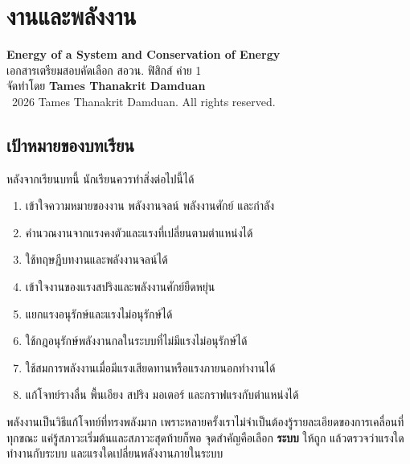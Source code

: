 
\chapter{งานและพลังงาน}

\begin{center}
    {\Large \textbf{Energy of a System and Conservation of Energy}}\\[4pt]
    {\normalsize เอกสารเตรียมสอบคัดเลือก สอวน. ฟิสิกส์ ค่าย 1}\\[6pt]
    {\normalsize จัดทำโดย \textbf{Tames Thanakrit Damduan}}\\[2pt]
    {\footnotesize \textcopyright\ 2026 Tames Thanakrit Damduan. All rights reserved.}\\[8pt]
\end{center}

\section*{เป้าหมายของบทเรียน}

หลังจากเรียนบทนี้ นักเรียนควรทำสิ่งต่อไปนี้ได้

\begin{enumerate}
    \item เข้าใจความหมายของงาน พลังงานจลน์ พลังงานศักย์ และกำลัง
    \item คำนวณงานจากแรงคงตัวและแรงที่เปลี่ยนตามตำแหน่งได้
    \item ใช้ทฤษฎีบทงานและพลังงานจลน์ได้
    \item เข้าใจงานของแรงสปริงและพลังงานศักย์ยืดหยุ่น
    \item แยกแรงอนุรักษ์และแรงไม่อนุรักษ์ได้
    \item ใช้กฎอนุรักษ์พลังงานกลในระบบที่ไม่มีแรงไม่อนุรักษ์ได้
    \item ใช้สมการพลังงานเมื่อมีแรงเสียดทานหรือแรงภายนอกทำงานได้
    \item แก้โจทย์รางลื่น พื้นเอียง สปริง มอเตอร์ และกราฟแรงกับตำแหน่งได้
\end{enumerate}

\begin{tcolorbox}[title=แนวคิดสำคัญของบทนี้]
พลังงานเป็นวิธีแก้โจทย์ที่ทรงพลังมาก เพราะหลายครั้งเราไม่จำเป็นต้องรู้รายละเอียดของการเคลื่อนที่ทุกขณะ แค่รู้สภาวะเริ่มต้นและสภาวะสุดท้ายก็พอ จุดสำคัญคือเลือก \textbf{ระบบ} ให้ถูก แล้วตรวจว่าแรงใดทำงานกับระบบ และแรงใดเปลี่ยนพลังงานภายในระบบ
\end{tcolorbox}

